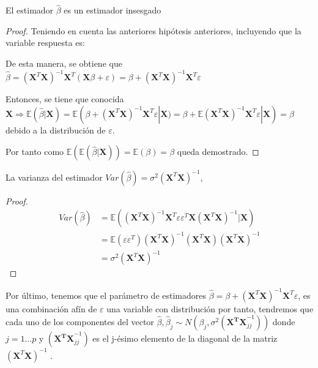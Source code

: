 \begin{propo}
El estimador $\hat{\beta}$ es un estimador insesgado \cite{Greene 2008}
\begin{proof}
Teniendo en cuenta las anteriores hipótesis anteriores, incluyendo que la variable respuesta es:  

\noindent De esta manera, se obtiene que $\hat{\beta}=(\mathbf{X}^T\mathbf{X})^{-1}\mathbf{X}^T(\mathbf{X}\beta+\varepsilon)=\beta+(\mathbf{X}^T\mathbf{X})^{-1}\mathbf{X}^T \varepsilon$

\noindent Entonces, se tiene que conocida $\mathbf{X} \Rightarrow \mathbb{E}(\hat{\beta}|\mathbf{X})=\mathbb{E}(\beta+(\mathbf{X}^T\mathbf{X})^{-1}\mathbf{X}^T \varepsilon|\mathbf{X})=\beta +\mathbb{E}(\mathbf{X}^T\mathbf{X})^{-1}\mathbf{X}^T \varepsilon|\mathbf{X})=\beta$ debido a la distribución de $\varepsilon$.

\noindent Por tanto como $\mathbb{E}(\mathbb{E}(\hat{\beta}|\mathbf{X}))=\mathbb{E}(\beta)=\beta$ queda demostrado. 
\end{proof}
\end{propo}

\begin{propo}
La varianza del estimador $Var(\hat{\beta})= \sigma^2 (\mathbf{X}^T \mathbf{X})^{-1}$\cite{Hastie 2001},\cite{Greene 2008}
\begin{proof}
\begin{equation}
\begin{split}
Var(\hat{\beta})&=\mathbb{E}((\mathbf{X}^T \mathbf{X})^{-1}\mathbf{X}^T \varepsilon \varepsilon^T\mathbf{X}(\mathbf{X}^T \mathbf{X})^{-1}|\mathbf{X})\\
&=\mathbb{E}(\varepsilon\varepsilon^T) (\mathbf{X}^T \mathbf{X})^{-1}(\mathbf{X}^T \mathbf{X})(\mathbf{X}^T \mathbf{X})^{-1} \\
&=\sigma^2 (\mathbf{X}^T \mathbf{X})^{-1}
\end{split}
\end{equation}
\end{proof}
\end{propo}

\noindent Por último, tenemos que el parámetro de estimadores $\hat{\beta}= \beta+(\mathbf{X}^T\mathbf{X})^{-1}\mathbf{X}^T \varepsilon$, es una combinación afín de $\varepsilon$ una variable con distribución por tanto, tendremos que cada uno de los componentes del vector $\hat{\beta},\hat{\beta}_j\sim N(\beta_j, \sigma^2(\mathbf{X^TX}_{jj}^{-1}))$ donde $ j=1\ldots p$ y $(\mathbf{X^TX}_{jj}^{-1})$ es el j-ésimo elemento de la diagonal de la matriz $(\mathbf{X}^T\mathbf{X})^{-1}$ \cite{Johnson 2007}.

